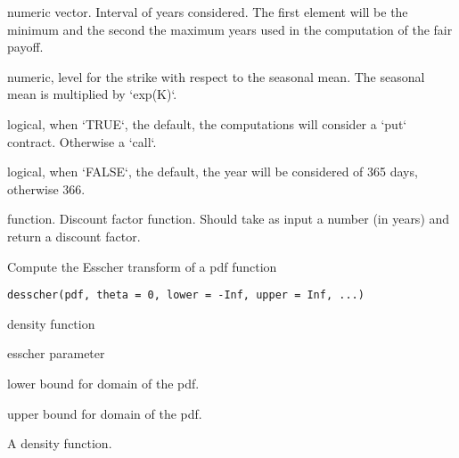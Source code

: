 \documentclass[a4paper]{book}
\begin{document}
%
\begin{Arguments}
\begin{ldescription}
\item[\code{nyears}] numeric vector. Interval of years considered. The first element will be the minimum and the second the maximum years used in
the computation of the fair payoff.

\item[\code{K}] numeric, level for the strike with respect to the seasonal mean. The seasonal mean is multiplied by `exp(K)`.

\item[\code{put}] logical, when `TRUE`, the default, the computations will consider a `put` contract. Otherwise a `call`.

\item[\code{leap\_year}] logical, when `FALSE`, the default, the year will be considered of 365 days, otherwise 366.

\item[\code{B}] function. Discount factor function. Should take as input a number (in years) and return a discount factor.
\end{ldescription}
\end{Arguments}
%
\begin{Description}\relax
Compute the Esscher transform of a pdf function
\end{Description}
%
\begin{Usage}
\begin{verbatim}
desscher(pdf, theta = 0, lower = -Inf, upper = Inf, ...)
\end{verbatim}
\end{Usage}
%
\begin{Arguments}
\begin{ldescription}
\item[\code{pdf}] density function

\item[\code{theta}] esscher parameter

\item[\code{lower}] lower bound for domain of the pdf.

\item[\code{upper}] upper bound for domain of the pdf.
\end{ldescription}
\end{Arguments}
%
\begin{Value}
A density function.
\end{Value}
\end{document}

